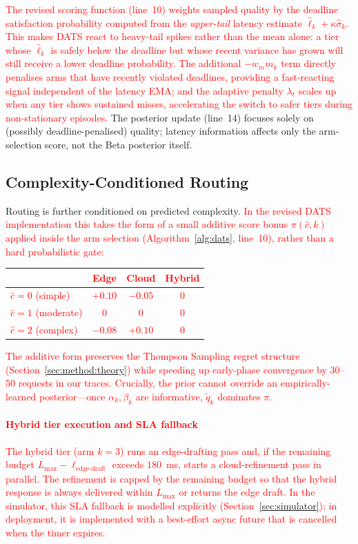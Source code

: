 \documentclass[final,3p,twocolumn,authoryear]{elsarticle}
\newcommand{\rev}[1]{\textcolor{red}{#1}}
\theoremstyle{plain}
\theoremstyle{definition}
\begin{document}
\rev{The revised scoring function (line~10) weights sampled quality by the deadline satisfaction probability computed from the \emph{upper-tail} latency estimate $\hat{\ell}_k + \kappa\hat{\sigma}_k$. This makes DATS react to heavy-tail spikes rather than the mean alone: a tier whose $\hat{\ell}_k$ is safely below the deadline but whose recent variance has grown will still receive a lower deadline probability. The additional $-w_m m_k$ term directly penalises arms that have recently violated deadlines, providing a fast-reacting signal independent of the latency EMA; and the adaptive penalty $\lambda_t$ scales up when any tier shows sustained misses, accelerating the switch to safer tiers during non-stationary episodes.}
The posterior update (line~14) focuses solely on (possibly deadline-penalised) quality; latency information affects only the arm-selection score, not the Beta posterior itself.

\subsection{Complexity-Conditioned Routing}
\label{sec:method:prior}

Routing is further conditioned on predicted complexity.
\rev{In the revised DATS implementation this takes the form of a small additive score bonus $\pi(\hat{c}, k)$ applied inside the arm selection (Algorithm~\ref{alg:dats}, line~10), rather than a hard probabilistic gate:}
\rev{
\begin{center}
\begin{tabular}{lccc}
  \toprule
  & Edge & Cloud & Hybrid \\
  \midrule
  $\hat{c}=0$ (simple)   & $+0.10$ & $-0.05$ & $0$ \\
  $\hat{c}=1$ (moderate) & $0$     & $0$     & $0$ \\
  $\hat{c}=2$ (complex)  & $-0.08$ & $+0.10$ & $0$ \\
  \bottomrule
\end{tabular}
\end{center}
}
\rev{The additive form preserves the Thompson Sampling regret structure (Section~\ref{sec:method:theory}) while speeding up early-phase convergence by $30$--$50$ requests in our traces. Crucially, the prior cannot override an empirically-learned posterior---once $\alpha_k, \beta_k$ are informative, $\tilde{q}_k$ dominates $\pi$.}

\rev{\paragraph{Hybrid tier execution and SLA fallback}
The hybrid tier (arm $k{=}3$) runs an edge-drafting pass and, if the remaining budget $L_{\max} - \ell_{\text{edge-draft}}$ exceeds $180$~ms, starts a cloud-refinement pass in parallel. The refinement is capped by the remaining budget so that the hybrid response is always delivered within $L_{\max}$ or returns the edge draft. In the simulator, this SLA fallback is modelled explicitly (Section~\ref{sec:simulator}); in deployment, it is implemented with a best-effort async future that is cancelled when the timer expires.}
\end{document}
